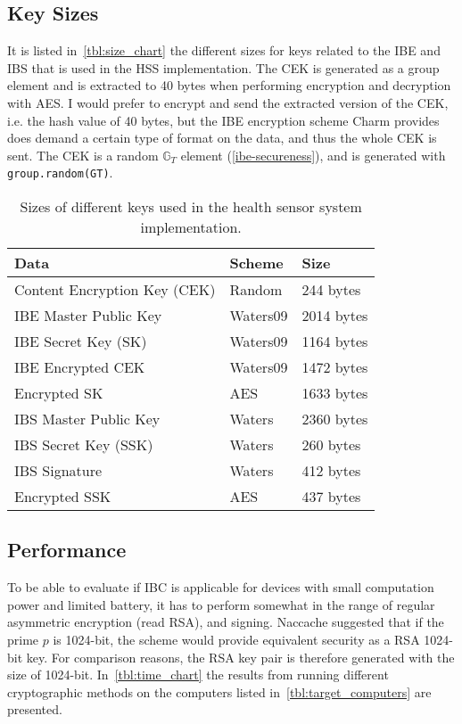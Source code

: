 \subsection{Key Sizes}
It is listed in~\autoref{tbl:size_chart} the different sizes for keys related to the \gls{IBE} and \gls{IBS} that is used in the \gls{HSS} implementation.
The \gls{CEK} is generated as a group element and is extracted to 40 bytes when performing encryption and decryption with \gls{AES}.
I would prefer to encrypt and send the extracted version of the \gls{CEK}, i.e. the hash value of 40 bytes, but the \gls{IBE} encryption scheme Charm provides does demand a certain type of format on the data, and thus the whole \gls{CEK} is sent.
The \gls{CEK} is a random $\mathbb{G}_T$ element (\autoref{ibe-secureness}), and is generated with \texttt{group.random(GT)}.
\begin{table}[h]
  \begin{tabular}[c]{p{}p{}p{}}
  Data                            & Scheme          & Size              \\ \hline
  Content Encryption Key (CEK)    & Random          & 244 bytes         \\ %
  IBE Master Public Key           & Waters09        & 2014 bytes        \\ %
  IBE Secret Key (SK)             & Waters09        & 1164 bytes        \\ %
  IBE Encrypted CEK               & Waters09        & 1472 bytes        \\ %
  Encrypted SK                    & AES             & 1633 bytes        \\ %
  IBS Master Public Key           & Waters          & 2360 bytes        \\ %
  IBS Secret Key (SSK)            & Waters          & 260 bytes         \\ %
  IBS Signature                   & Waters          & 412 bytes         \\ %
  Encrypted SSK                   & AES             & 437 bytes         \\ %
  \end{tabular}
  \caption{Sizes of different keys used in the health sensor system implementation.}
  \label{tbl:size_chart}
\end{table}


\subsection{Performance}\label{ibc-performance}
To be able to evaluate if \gls{IBC} is applicable for devices with small computation power and limited battery, it has to perform somewhat in the range of regular asymmetric encryption (read RSA), and signing. 
Naccache suggested that if the prime $p$ is 1024-bit, the scheme would provide equivalent security as a RSA 1024-bit key.
For comparison reasons, the RSA key pair is therefore generated with the size of 1024-bit.
In~\autoref{tbl:time_chart} the results from running different cryptographic methods on the computers listed in~\autoref{tbl:target_computers} are presented.

